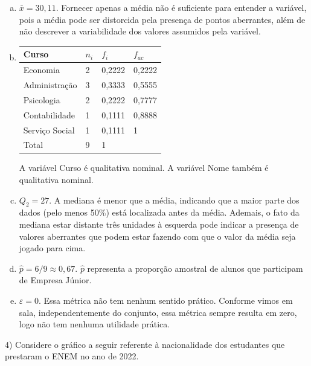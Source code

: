 \documentclass[12pt]{article}
\begin{document}
\begin{enumerate}[a)]
    \item $\bar{x}=30,11$. Fornecer apenas a média não é suficiente para entender a variável, pois a média pode ser distorcida pela presença de pontos aberrantes, além de não descrever a variabilidade dos valores assumidos pela variável. 
    
    \item \begin{table}[H]
    \centering
    \begin{tabular}{llll}
    \hline
    Curso          & $n_i$ & $f_i$  & $f_{ac}$ \\ \hline
    Economia       & 2     & 0,2222 & 0,2222   \\
    Administração  & 3     & 0,3333 & 0,5555   \\
    Psicologia     & 2     & 0,2222 & 0,7777   \\
    Contabilidade  & 1     & 0,1111 & 0,8888   \\
    Serviço Social & 1     & 0,1111 & 1        \\
    Total          & 9     & 1      &          \\ \hline
    \end{tabular}
    \end{table}
    
    A variável Curso é qualitativa nominal. A variável Nome também é qualitativa nominal.
    
    \item $Q_2 = 27$. A mediana é menor que a média, indicando que a maior parte dos dados (pelo menos 50\%) está localizada antes da média. Ademais, 
    o fato da mediana estar distante três unidades à esquerda pode indicar a presença de valores aberrantes que podem estar fazendo com que o valor da média seja jogado para cima.
    
    \item $\hat{p} = 6/9 \approx 0,67$. $\hat{p}$ representa a proporção amostral de alunos que participam de Empresa Júnior. 
    
    \item $\varepsilon = 0$. Essa métrica não tem nenhum sentido prático. Conforme vimos em sala, independentemente do conjunto, essa métrica sempre resulta em zero, logo não tem nenhuma utilidade prática. 
\end{enumerate}

\vspace{5px}

4) Considere o gráfico a seguir referente à nacionalidade dos estudantes que prestaram o ENEM no ano de 2022. 
\end{document}
